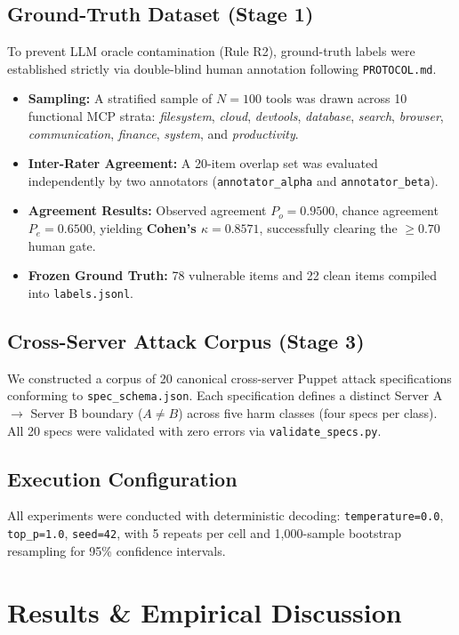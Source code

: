\documentclass[conference]{IEEEtran}
\begin{document}
\subsection{Ground-Truth Dataset (Stage 1)}
To prevent LLM oracle contamination (Rule R2), ground-truth labels were established strictly via double-blind human annotation following \texttt{PROTOCOL.md}.
\begin{itemize}
    \item \textbf{Sampling:} A stratified sample of $N=100$ tools was drawn across 10 functional MCP strata: \textit{filesystem}, \textit{cloud}, \textit{devtools}, \textit{database}, \textit{search}, \textit{browser}, \textit{communication}, \textit{finance}, \textit{system}, and \textit{productivity}.
    \item \textbf{Inter-Rater Agreement:} A 20-item overlap set was evaluated independently by two annotators (\texttt{annotator\_alpha} and \texttt{annotator\_beta}).
    \item \textbf{Agreement Results:} Observed agreement $P_o = 0.9500$, chance agreement $P_e = 0.6500$, yielding \textbf{Cohen's $\kappa = 0.8571$}, successfully clearing the $\ge 0.70$ human gate.
    \item \textbf{Frozen Ground Truth:} 78 vulnerable items and 22 clean items compiled into \texttt{labels.jsonl}.
\end{itemize}

\subsection{Cross-Server Attack Corpus (Stage 3)}
We constructed a corpus of 20 canonical cross-server Puppet attack specifications conforming to \texttt{spec\_schema.json}. Each specification defines a distinct Server A $\to$ Server B boundary ($A \neq B$) across five harm classes (four specs per class). All 20 specs were validated with zero errors via \texttt{validate\_specs.py}.

\subsection{Execution Configuration}
All experiments were conducted with deterministic decoding: \texttt{temperature=0.0}, \texttt{top\_p=1.0}, \texttt{seed=42}, with 5 repeats per cell and 1,000-sample bootstrap resampling for 95\% confidence intervals.

\section{Results \& Empirical Discussion}
\end{document}
